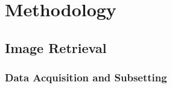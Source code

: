 %
%
%
%
%



\graphicspath{{content/chapters/3_methodology/figures/}}

\chapter{Methodology}%
\label{chp:methodology}


\section{Image Retrieval}

\subsection{Data Acquisition and Subsetting}

